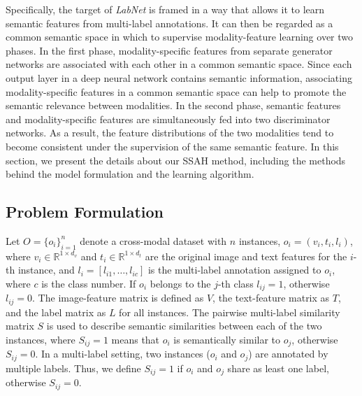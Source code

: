 \documentclass[10pt,twocolumn,letterpaper]{article}
\begin{document}
Specifically, the target of \emph{LabNet} is framed in a way that allows it to learn semantic features from multi-label annotations. It can then be regarded as a common semantic space in which to supervise modality-feature learning over two phases. In the first phase, modality-specific features from separate generator networks are associated with each other in a common semantic space. Since each output layer in a deep neural network contains semantic information, associating modality-specific features in a common semantic space can help to promote the semantic relevance between modalities. In the second phase, semantic features and modality-specific features are simultaneously fed into two discriminator networks. As a result, the feature distributions of the two modalities tend to become consistent under the supervision of the same semantic feature. In this section, we present the details about our SSAH method, including the methods behind the model formulation and the learning algorithm.
\vspace{-0.2cm}
\subsection{Problem Formulation}
\vspace{-0.15cm}
\label{section: Problem Definition}
Let $O=\{o_{i}\}_{i=1}^{n}$ denote a cross-modal dataset with $n$ instances, $o_{i}=(v_{i}, t_{i}, l_{i})$, where $v_{i}\in\mathbb{R}^{1\times d_{v}}$ and $t_{i}\in\mathbb{R}^{1\times d_{t}}$ are the original image and text features for the $i$-th instance, and $l_{i}=[l_{i1},\ldots,l_{ic}]$ is the multi-label annotation assigned to $o_{i}$, where $c$ is the class number. If $o_{i}$ belongs to the $j$-th class $l_{ij}=1$, otherwise $l_{ij}=0$. The image-feature matrix is defined as $V$, the text-feature matrix as $T$, and the label matrix as $L$ for all instances. The pairwise multi-label similarity matrix $S$ is used to describe semantic similarities between each of the two instances, where $S_{ij}=1$ means that $o_{i}$ is semantically similar to $o_{j}$, otherwise $S_{ij}=0$. In a multi-label setting, two instances ($o_{i}$ and $o_{j}$) are annotated by multiple labels. Thus, we define $S_{ij} = 1$ if $o_{i}$ and $o_{j}$ share as least one label, otherwise $S_{ij}=0$.
\end{document}
